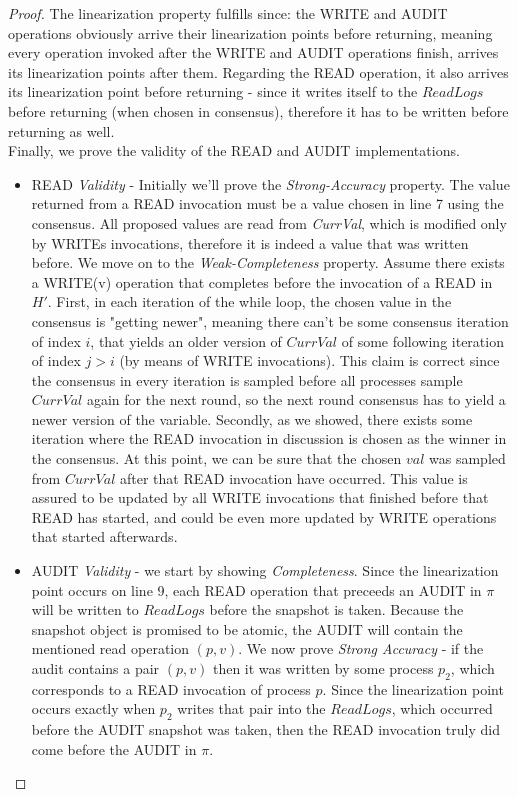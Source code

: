\documentclass[11pt]{article}
\theoremstyle{definition}
\begin{document}
\begin{proof}
The linearization property fulfills since: the WRITE and AUDIT operations obviously arrive their linearization points before returning, meaning every operation invoked after the WRITE and AUDIT operations finish, arrives its linearization points after them. Regarding the READ operation, it also arrives its linearization point before returning - since it writes itself to the $ReadLogs$ before returning (when chosen in consensus), therefore it has to be written before returning as well.\\

Finally, we prove the validity of the READ and AUDIT implementations. 

\begin{itemize}
\item READ \textit{Validity} - Initially we'll prove the \textit{Strong-Accuracy} property.  The value returned from a READ invocation must be a value chosen in line 7 using the consensus. All proposed values are read from \textit{CurrVal}, which is modified only by WRITEs invocations, therefore it is indeed a value that was written before. We move on to the \textit{Weak-Completeness} property. Assume there exists a WRITE(v) operation that completes before the invocation of a READ in $H'$. First, in each iteration of the while loop, the chosen value in the consensus is "getting newer", meaning there can't be some consensus iteration of index $i$, that yields an older version of $CurrVal$ of some following iteration of index $j>i$ (by means of WRITE invocations). This claim is correct since the consensus in every iteration is sampled before all processes sample $CurrVal$ again for the next round, so the next round consensus has to yield a newer version of the variable. Secondly, as we showed, there exists some iteration where the READ invocation in discussion is chosen as the winner in the consensus. At this point, we can be sure that the chosen $val$ was sampled from $CurrVal$ after that READ invocation have occurred. This value is assured to be updated by all WRITE invocations that finished before that READ has started, and could be even more updated by WRITE operations that started afterwards.

\item AUDIT \textit{Validity} - we start by showing \textit{Completeness}. Since the linearization point occurs on line 9, each READ operation that preceeds an AUDIT in $\pi$ will be written to $ReadLogs$ before the snapshot is taken. Because the snapshot object is promised to be atomic, the AUDIT will contain the mentioned read operation $(p,v)$. We now prove \textit{Strong Accuracy} - if the audit contains a pair $(p,v)$ then it was written by some process $p_2$, which corresponds to a READ invocation of process $p$. Since the linearization point occurs exactly when $p_2$ writes that pair into the $ReadLogs$, which occurred before the AUDIT snapshot was taken, then the READ invocation truly did come before the AUDIT in $\pi$.

\end{itemize}


\end{proof}
\end{document}
